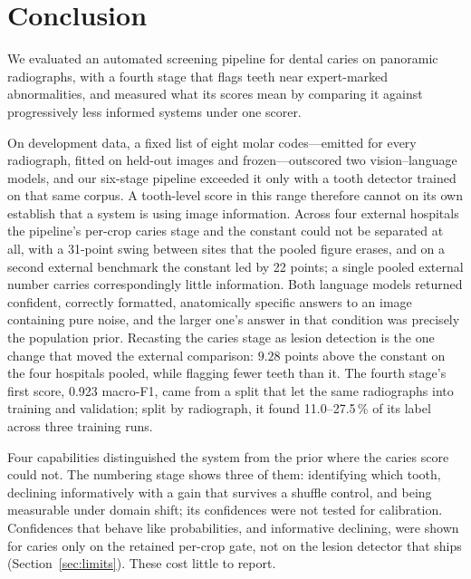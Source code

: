 \documentclass[conference]{IEEEtran}
\begin{document}
\section{Conclusion}

We evaluated an automated screening pipeline for dental caries on panoramic
radiographs, with a fourth stage that flags teeth near expert-marked
abnormalities, and measured what its scores mean by
comparing it against progressively less informed systems under one scorer.

On development data, a fixed list of eight molar codes---emitted for every
radiograph, fitted on held-out images and frozen---outscored two
vision--language models, and our six-stage pipeline exceeded it only with a tooth
detector trained on that same corpus. A tooth-level score in this range therefore
cannot on its own establish that a system is using image information. Across four
external hospitals the pipeline's per-crop caries stage and the constant could
not be separated at all, with a 31-point swing between sites that the pooled
figure erases, and on a second external benchmark the constant led by 22 points;
a single pooled external number carries correspondingly little
information. Both language models returned confident, correctly formatted,
anatomically specific answers to an image containing pure noise, and the larger
one's answer in that condition was precisely the population prior. Recasting the
caries stage as lesion detection is the one change that moved the external
comparison: $9.28$ points above the constant on the four hospitals pooled, while
flagging fewer teeth than it. The
fourth stage's first score, 0.923 macro-F1, came from a split that let the same
radiographs into training and validation; split by radiograph, it found
11.0--27.5\,\% of its label across three training runs.

Four capabilities distinguished the system from the prior where the caries score
could not. The numbering stage shows three of them: identifying which tooth,
declining informatively with a gain that survives a shuffle control, and being
measurable under domain shift; its confidences were not tested for calibration.
Confidences that behave like probabilities, and informative declining, were shown
for caries only on the retained per-crop gate, not on the lesion detector that
ships (Section~\ref{sec:limits}). These cost little to report.
\end{document}
